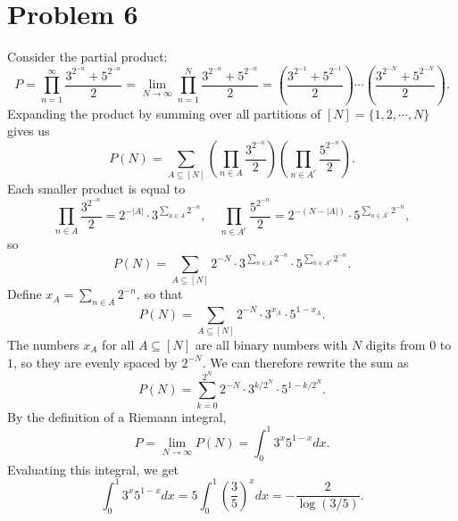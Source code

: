 \documentclass{article}
\newcommand{\bigp}[1]{\left(#1\right)}
\begin{document}
\section*{Problem 6}
Consider the partial product:
$$P = \prod_{n = 1}^\infty \frac{3^{2^{-n}} + 5^{2^{-n}}}{2} = \lim_{N \to \infty} \prod_{n = 1}^N \frac{3^{2^{-n}} + 5^{2^{-n}}}{2} = \bigp{\frac{3^{2^{-1}} + 5^{2^{-1}}}{2}}\cdots\bigp{\frac{3^{2^{-N}} + 5^{2^{-N}}}{2}}.$$
Expanding the product by summing over all partitions of $[N] = \{1, 2, \cdots, N\}$ gives us
$$P(N) = \sum_{A \subseteq [N]} \bigp{\prod_{n \in A} \frac{3^{2^{-n}}}{2}}\bigp{\prod_{n \in A^c} \frac{5^{2^{-n}}}{2}}.$$
Each smaller product is equal to
$$\prod_{n \in A} \frac{3^{2^{-n}}}{2} = 2^{-|A|}\cdot 3^{\sum_{n \in A} 2^{-n}}, \quad \prod_{n \in A^c} \frac{5^{2^{-n}}}{2} = 2^{-(N - |A|)}\cdot 5^{\sum_{n \in A^c} 2^{-n}},$$
so
$$P(N) = \sum_{A \subseteq [N]}2^{-N} \cdot 3^{\sum_{n \in A} 2^{-n}} \cdot 5^{\sum_{n \in A^c} 2^{-n}}.$$
Define $x_A = \sum_{n \in A} 2^{-n}$, so that
$$P(N) = \sum_{A \subseteq [N]} 2^{-N}\cdot 3^{x_A}\cdot 5^{1 - x_A}.$$
The numbers $x_A$ for all $A \subseteq [N]$ are all binary numbers with $N$ digits from $0$ to $1$, so they are evenly spaced by $2^{-N}$. We can therefore rewrite the sum as
$$P(N) = \sum_{k = 0}^{2^N}2^{-N} \cdot 3^{k/2^N}\cdot 5^{1 - k/2^N}.$$
By the definition of a Riemann integral,
$$P = \lim_{N \to \infty} P(N) = \int_0^1 3^x 5^{1 - x} dx.$$
Evaluating this integral, we get
$$\int_0^1 3^x 5^{1 - x} dx = 5\int_0^1 \bigp{\frac 35}^x dx = -\frac{2}{\log(3/5)}.$$
\end{document}
